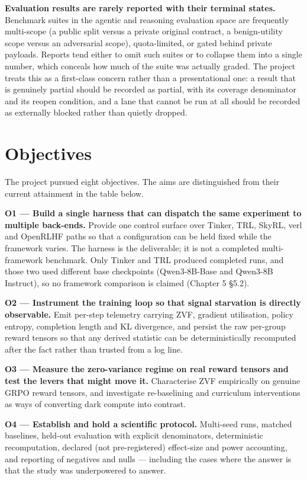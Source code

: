 \documentclass[12pt,a4paper]{report}
\begin{document}
\textbf{Evaluation results are rarely reported with their terminal
states.} Benchmark suites in the agentic and reasoning evaluation space
are frequently multi-scope (a public split versus a private original
contract, a benign-utility scope versus an adversarial scope),
quota-limited, or gated behind private payloads. Reports tend either to
omit such suites or to collapse them into a single number, which
conceals how much of the suite was actually graded. The project treats
this as a first-class concern rather than a presentational one: a result
that is genuinely partial should be recorded as partial, with its
coverage denominator and its reopen condition, and a lane that cannot be
run at all should be recorded as externally blocked rather than quietly
dropped.

\section{Objectives}\label{objectives}

The project pursued eight objectives. The aims are distinguished from
their current attainment in the table below.

\textbf{O1 --- Build a single harness that can dispatch the same
experiment to multiple back-ends.} Provide one control surface over
Tinker, TRL, SkyRL, verl and OpenRLHF paths so that a configuration can
be held fixed while the framework varies. The harness is the
deliverable; it is not a completed multi-framework benchmark. Only
Tinker and TRL produced completed runs, and those two used different
base checkpoints (Qwen3-8B-Base and Qwen3-8B Instruct), so no framework
comparison is claimed (Chapter 5 §5.2).

\textbf{O2 --- Instrument the training loop so that signal starvation is
directly observable.} Emit per-step telemetry carrying ZVF, gradient
utilisation, policy entropy, completion length and KL divergence, and
persist the raw per-group reward tensors so that any derived statistic
can be deterministically recomputed after the fact rather than trusted
from a log line.

\textbf{O3 --- Measure the zero-variance regime on real reward tensors
and test the levers that might move it.} Characterise ZVF empirically on
genuine GRPO reward tensors, and investigate re-baselining and
curriculum interventions as ways of converting dark compute into
contrast.

\textbf{O4 --- Establish and hold a scientific protocol.} Multi-seed
runs, matched baselines, held-out evaluation with explicit denominators,
deterministic recomputation, declared (not pre-registered) effect-size
and power accounting, and reporting of negatives and nulls --- including
the cases where the answer is that the study was underpowered to answer.
\end{document}
